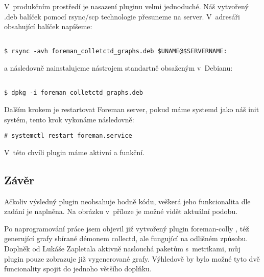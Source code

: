 V~produkčním prostředí je nasazení pluginu velmi jednoduché. Náš vytvořený .deb balíček pomocí rsync/scp technologie přesuneme na server. V~adresáři obsahující balíček napíšeme:
\begin{verbatim}

$ rsync -avh foreman_colletctd_graphs.deb $UNAME@$SERVERNAME:
\end{verbatim}

a následovně nainstalujeme nástrojem standartně obsaženým v~Debianu:
\begin{verbatim}

$ dpkg -i foreman_colletctd_graphs.deb
\end{verbatim}

Dalším krokem je restartovat Foreman server, pokud máme systemd jako náš init systém, tento krok vykonáme následovně:
\begin{verbatim}
# systemctl restart foreman.service
\end{verbatim}

V~této chvíli plugin máme aktivní a funkční.

\subsection{Závěr}

Ačkoliv výsledný plugin neobsahuje hodně kódu, veškerá jeho funkcionalita dle zadání je naplněna. Na obrázku v~příloze je možné vidět aktuální podobu.

Po naprogramování práce jsem objevil již vytvořený plugin foreman-colly \cite{foreman-colly}, též generující grafy sbírané démonem collectd, ale fungující na odlišném způsobu. Doplněk od Lukáše Zapletala aktivně naslouchá paketům s~metrikami, můj plugin pouze zobrazuje již vygenerované grafy. Výhledově by bylo možné tyto dvě funcionality spojit do jednoho většího doplňku.
